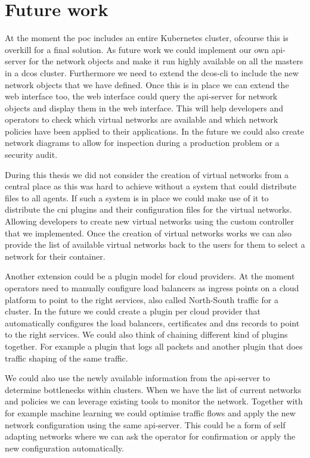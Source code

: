 \chapter{Future work}
\label{chap:future-work}
At the moment the \gls{poc} includes an entire Kubernetes cluster, ofcourse this is overkill for a final solution. As future work we could implement our own api-server for the network objects and make it run highly available on all the masters in a \gls{dcos} cluster. Furthermore we need to extend the dcos-cli to include the new network objects that we have defined. Once this is in place we can extend the web interface too, the web interface could query the api-server for network objects and display them in the web interface. This will help developers and operators to check which virtual networks are available and which network policies have been applied to their applications. In the future we could also create network diagrams to allow for inspection during a production problem or a security audit.

During this thesis we did not consider the creation of virtual networks from a central place as this was hard to achieve without a system that could distribute files to all agents. If such a system is in place we could make use of it to distribute the \gls{cni} plugins and their configuration files for the virtual networks. Allowing developers to create new virtual networks using the custom controller that we implemented. Once the creation of virtual networks works we can also provide the list of available virtual networks back to the users for them to select a network for their container.

Another extension could be a plugin model for cloud providers. At the moment operators need to manually configure load balancers as ingress points on a cloud platform to point to the right services, also called North-South traffic for a cluster. In the future we could create a plugin per cloud provider that automatically configures the load balancers, certificates and \gls{dns} records to point to the right services. We could also think of chaining different kind of plugins together. For example a plugin that logs all packets and another plugin that does traffic shaping of the same traffic.

We could also use the newly available information from the api-server to determine bottlenecks within clusters. When we have the list of current networks and policies we can leverage existing tools to monitor the network. Together with for example machine learning we could optimise traffic flows and apply the new network configuration using the same api-server. This could be a form of self adapting networks where we can ask the operator for confirmation or apply the new configuration automatically.
